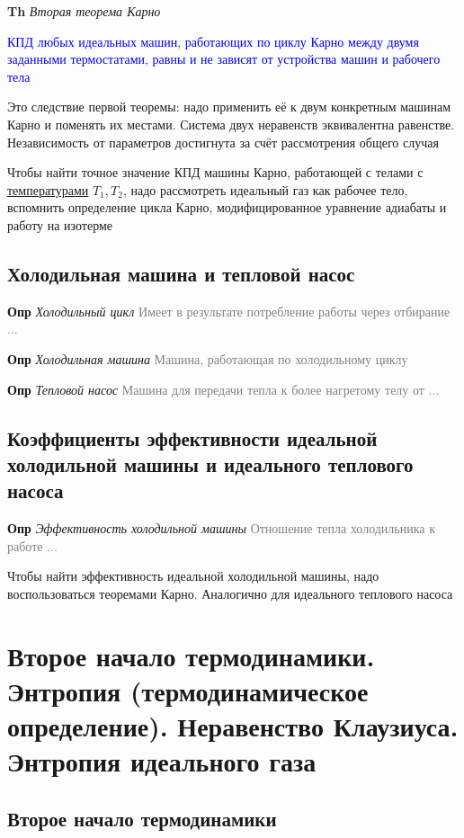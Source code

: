 \documentclass[a4paper, 14pt]{article}
\begin{document}
    \textbf{Th} \textit{Вторая теорема Карно}

    \textcolor{blue}{КПД любых идеальных машин, работающих по циклу Карно между двумя заданными термостатами, равны и
    не зависят от устройства машин и рабочего тела}

    Это следствие первой теоремы: надо применить её к двум конкретным машинам Карно и поменять их местами.
    Система двух неравенств эквивалентна равенстве.
    Независимость от параметров достигнута за счёт рассмотрения общего случая

    Чтобы найти точное значение КПД машины Карно, работающей с телами с \underline{температурами} $T_1, T_2$, надо
    рассмотреть идеальный газ как рабочее тело, вспомнить определение цикла Карно, модифицированное уравнение
    адиабаты и работу на изотерме

    \subsection{Холодильная машина и тепловой насос}

    \textbf{Опр} \textit{Холодильный цикл} \textcolor{gray}{Имеет в результате потребление работы через отбирание ...}

    \textbf{Опр} \textit{Холодильная машина} \textcolor{gray}{Машина, работающая по холодильному циклу}

    \textbf{Опр} \textit{Тепловой насос} \textcolor{gray}{Машина для передачи тепла к более нагретому телу от ...}

    \subsection{Коэффициенты эффективности идеальной холодильной машины и идеального теплового насоса}

    \textbf{Опр} \textit{Эффективность холодильной машины} \textcolor{gray}{Отношение тепла холодильника к работе ...}

    Чтобы найти эффективность идеальной холодильной машины, надо воспользоваться теоремами Карно.
    Аналогично для идеального теплового насоса

    \section{Второе начало термодинамики.
    Энтропия (термодинамическое определение).
    Неравенство Клаузиуса.
    Энтропия идеального газа}

    \subsection{Второе начало термодинамики}
\end{document}
